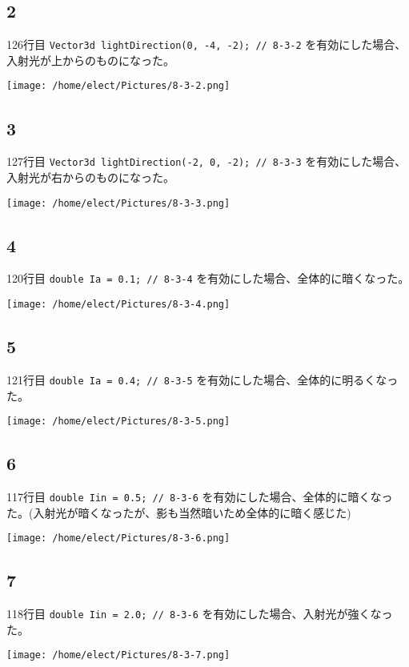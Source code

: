 \documentclass{scrartcl}
\begin{document}
\subsection{2}
\label{sec:orgcbde6ef}
126行目 \texttt{Vector3d lightDirection(0, -4, -2); // 8-3-2} を有効にした場合、入射光が上からのものになった。\\
\begin{center}
\texttt{[image: /home/elect/Pictures/8-3-2.png]}
\end{center}
\subsection{3}
\label{sec:orgd2c241b}
127行目 \texttt{Vector3d lightDirection(-2, 0, -2); // 8-3-3} を有効にした場合、入射光が右からのものになった。\\
\begin{center}
\texttt{[image: /home/elect/Pictures/8-3-3.png]}
\end{center}
\subsection{4}
\label{sec:orge8bdaa5}
120行目 \texttt{double Ia  = 0.1; // 8-3-4} を有効にした場合、全体的に暗くなった。\\
\begin{center}
\texttt{[image: /home/elect/Pictures/8-3-4.png]}
\end{center}
\subsection{5}
\label{sec:orgf332c6b}
121行目 \texttt{double Ia  = 0.4; // 8-3-5} を有効にした場合、全体的に明るくなった。\\
\begin{center}
\texttt{[image: /home/elect/Pictures/8-3-5.png]}
\end{center}
\subsection{6}
\label{sec:org7d58922}
117行目 \texttt{double Iin = 0.5; // 8-3-6} を有効にした場合、全体的に暗くなった。(入射光が暗くなったが、影も当然暗いため全体的に暗く感じた)\\
\begin{center}
\texttt{[image: /home/elect/Pictures/8-3-6.png]}
\end{center}
\subsection{7}
\label{sec:orgcd44449}
118行目 \texttt{double Iin = 2.0; // 8-3-6} を有効にした場合、入射光が強くなった。\\
\begin{center}
\texttt{[image: /home/elect/Pictures/8-3-7.png]}
\end{center}
\end{document}
